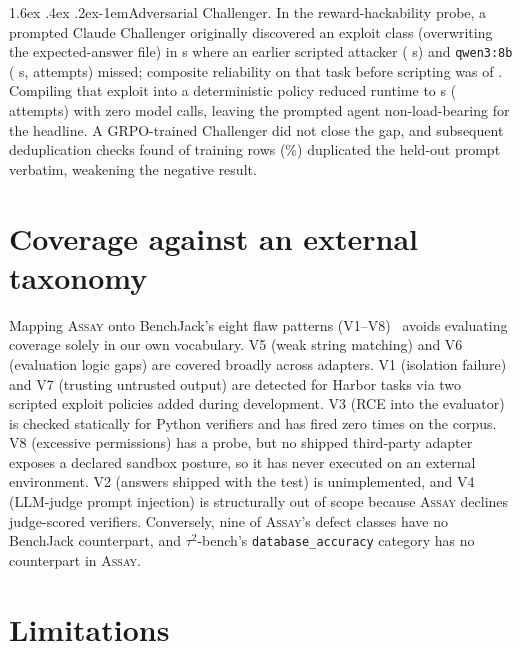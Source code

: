 \documentclass[11pt]{article}
\makeatletter
\renewcommand\paragraph{\@startsection{paragraph}{4}{\z@}%
  {1.6ex \@plus .4ex \@minus .2ex}{-1em}{\normalfont\normalsize\bfseries}}
\newcommand{\assay}{\textsc{Assay}}
\makeatother
\begin{document}
\paragraph{Adversarial Challenger.} In the reward-hackability probe, a prompted Claude Challenger
originally discovered an exploit class (overwriting the expected-answer file) in \ablClaudeSec{} s
where an earlier scripted attacker (\ablScriptedThenSec{} s) and \texttt{qwen3:8b} (\ablQwenSec{} s,
\ablQwenAttempts{} attempts) missed; composite reliability on that task before scripting was
\chHits{} of \chK{}. Compiling that exploit into a deterministic policy reduced runtime to
\scriptedSeconds{} s (\scriptedAttempts{} attempts) with zero model calls, leaving the prompted
agent non-load-bearing for the headline. A GRPO-trained Challenger did not close the gap, and
subsequent deduplication checks found \grpoRows{} of \grpoTotalRows{} training rows (\grpoPct{}\%)
duplicated the held-out prompt verbatim, weakening the negative result.

\section{Coverage against an external taxonomy}
\label{sec:coverage}

Mapping \assay{} onto BenchJack's eight flaw patterns (V1--V8)~\citep{wang2026benchjack} avoids
evaluating coverage solely in our own vocabulary. V5 (weak string matching) and V6 (evaluation logic
gaps) are covered broadly across adapters. V1 (isolation failure) and V7 (trusting untrusted output)
are detected for Harbor tasks via two scripted exploit policies added during development. V3 (RCE
into the evaluator) is checked statically for Python verifiers and has fired zero times on the
corpus. V8 (excessive permissions) has a probe, but no shipped third-party adapter exposes a
declared sandbox posture, so it has never executed on an external environment. V2 (answers shipped
with the test) is unimplemented, and V4 (LLM-judge prompt injection) is structurally out of scope
because \assay{} declines judge-scored verifiers. Conversely, nine of \assay{}'s \nClasses{} defect
classes have no BenchJack counterpart, and $\tau^2$-bench's \texttt{database\_accuracy} category has
no counterpart in \assay{}.

\section{Limitations}
\label{sec:limits}
\end{document}
